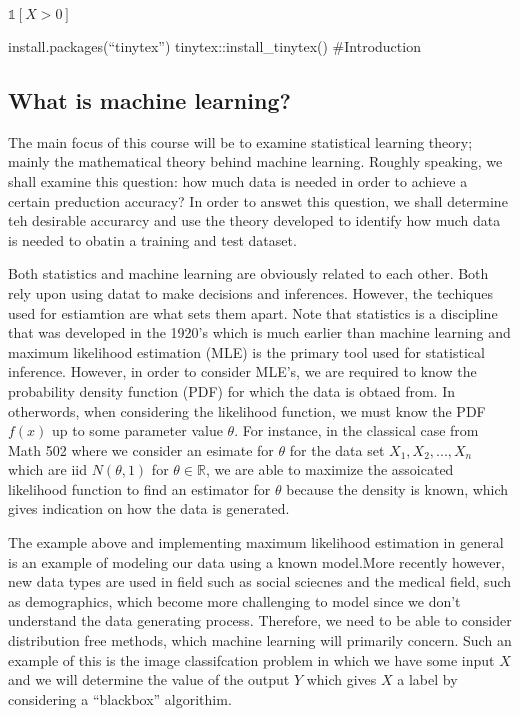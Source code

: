 \documentclass[
]{article}
\begin{document}
\(\mathbb{1}[X>0]\)

install.packages(``tinytex'') tinytex::install\_tinytex() \#Introduction

\hypertarget{what-is-machine-learning}{%
\subsection{What is machine learning?}\label{what-is-machine-learning}}

The main focus of this course will be to examine statistical learning
theory; mainly the mathematical theory behind machine learning. Roughly
speaking, we shall examine this question: how much data is needed in
order to achieve a certain preduction accuracy? In order to answet this
question, we shall determine teh desirable accurarcy and use the theory
developed to identify how much data is needed to obatin a training and
test dataset.

Both statistics and machine learning are obviously related to each
other. Both rely upon using datat to make decisions and inferences.
However, the techiques used for estiamtion are what sets them apart.
Note that statistics is a discipline that was developed in the 1920's
which is much earlier than machine learning and maximum likelihood
estimation (MLE) is the primary tool used for statistical inference.
However, in order to consider MLE's, we are required to know the
probability density function (PDF) for which the data is obtaed from. In
otherwords, when considering the likelihood function, we must know the
PDF \(f(x)\) up to some parameter value \(\theta\). For instance, in the
classical case from Math 502 where we consider an esimate for \(\theta\)
for the data set \(X_1, X_2,..., X_n\) which are iid \(N(\theta, 1)\)
for \(\theta \in \mathbb{R}\), we are able to maximize the assoicated
likelihood function to find an estimator for \(\theta\) because the
density is known, which gives indication on how the data is generated.

The example above and implementing maximum likelihood estimation in
general is an example of modeling our data using a known model.More
recently however, new data types are used in field such as social
sciecnes and the medical field, such as demographics, which become more
challenging to model since we don't understand the data generating
process. Therefore, we need to be able to consider distribution free
methods, which machine learning will primarily concern. Such an example
of this is the image classifcation problem in which we have some input
\(X\) and we will determine the value of the output \(Y\) which gives
\(X\) a label by considering a ``blackbox'' algorithim.
\end{document}
